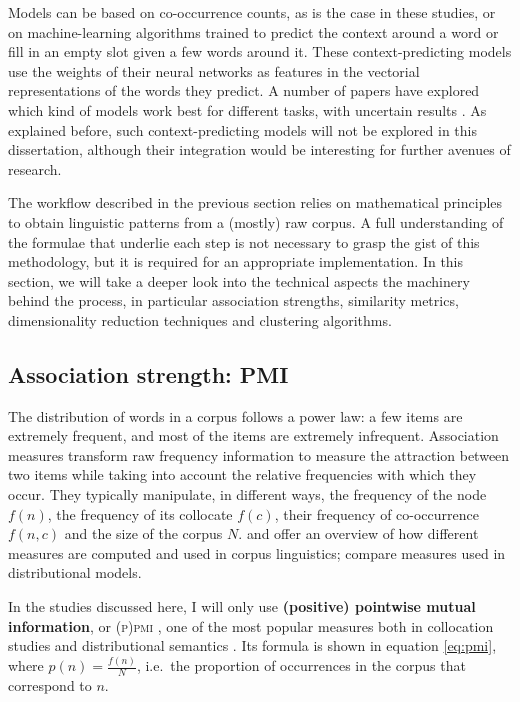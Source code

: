 \documentclass[
]{book}
\begin{document}
Models can be based on co-occurrence counts, as is the case in these studies, or on machine-learning algorithms trained to predict the context around a word or fill in an empty slot given a few words around it. These context-predicting models use the weights of their neural networks as features in the vectorial representations of the words they predict. A number of papers have explored which kind of models work best for different tasks, with uncertain results \autocite{baroni.etal_2014,levy.etal_2015}.
As explained before, such context-predicting models will not be explored in this dissertation, although their integration would be interesting for further avenues of research.

The workflow described in the previous section relies on mathematical principles to obtain linguistic patterns from a (mostly) raw corpus. A full understanding of the formulae that underlie each step is not necessary to grasp the gist of this methodology, but it is required for an appropriate implementation.
In this section, we will take a deeper look into the technical aspects the machinery behind the process, in particular association strengths, similarity metrics, dimensionality reduction techniques and clustering algorithms.

\hypertarget{pmi}{%
\subsection{Association strength: PMI}\label{pmi}}

The distribution of words in a corpus follows a power law: a few items are extremely frequent, and most of the items are extremely infrequent. Association measures transform raw frequency information to measure the attraction between two items while taking into account the relative frequencies with which they occur. They typically manipulate, in different ways, the frequency of the node \(f(n)\), the frequency of its collocate \(f(c)\), their frequency of co-occurrence \(f(n,c)\) and the size of the corpus \(N\). \textcite{evert_2009} and \textcite{gablasova.etal_2017} offer an overview of how different measures are computed and used in corpus linguistics; \textcite{kiela.clark_2014}
compare measures used in distributional models.

In the studies discussed here, I will only use \textbf{(positive) pointwise mutual information}, or \textsc{(p)pmi} \autocite{church.hanks_1989}, one of the most popular measures both in collocation studies and distributional semantics \autocite{bullinaria.levy_2007,kiela.clark_2014,jurafsky.martin_2020,lapesa.evert_2014}.
Its formula is shown in equation \eqref{eq:pmi}, where \(p(n) = \frac{f(n)}{N}\), i.e.~the proportion of occurrences in the corpus that correspond to \(n\).
\end{document}
